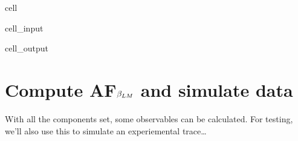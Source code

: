 \documentclass[letterpaper,table,10pt,english]{jupyterBook}
\begin{document}
\begin{sphinxuseclass}{cell}\begin{sphinxVerbatimInput}

\begin{sphinxuseclass}{cell_input}
\begin{sphinxVerbatim}[commandchars=\\\{\}]
\PYG{p}{[}\PYG{p}{]}\PYG{p}{[}\PYG{p}{]}    
\PYG{p}{[}\PYG{p}{]}\PYG{p}{[}\PYG{p}{]}
\end{sphinxVerbatim}

\end{sphinxuseclass}\end{sphinxVerbatimInput}
\begin{sphinxVerbatimOutput}

\begin{sphinxuseclass}{cell_output}
\noindent{}

\end{sphinxuseclass}\end{sphinxVerbatimOutput}

\end{sphinxuseclass}

\section{Compute AF\sphinxhyphen{}\protect\(\beta_{LM}\protect\) and simulate data}
\label{\detokenize{part2/basic_fitting_numerics_intro_260423:compute-af-beta-lm-and-simulate-data}}
\sphinxAtStartPar
With all the components set, some observables can be calculated. For testing, we’ll also use this to simulate an experiemental trace…
\end{document}
